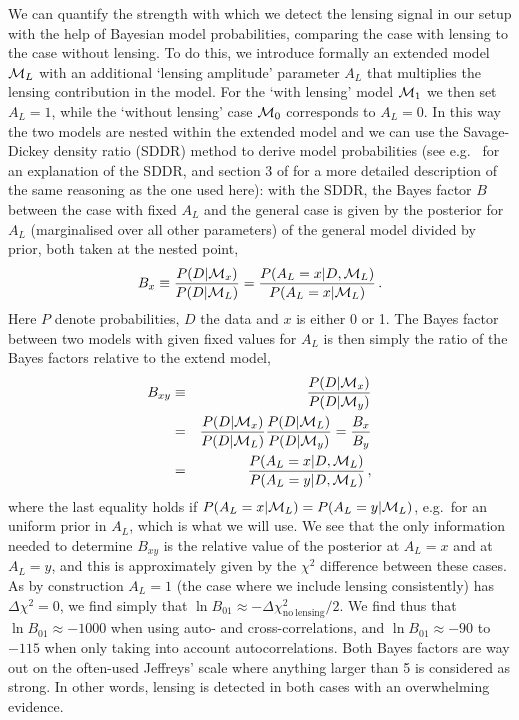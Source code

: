 We can quantify the strength with which we detect the lensing signal in our setup with the help of Bayesian model probabilities, comparing the case with lensing to the case without lensing. To do this, we introduce formally an extended model ${\mathcal M}_L$ with an additional `lensing amplitude' parameter $A_L$ that multiplies the lensing contribution in the model. For the `with lensing' model ${\mathcal M}_1$ we then set $A_L = 1$, while the `without lensing' case ${\mathcal M}_0$ corresponds to $A_L=0$. In this way the two models are nested within the extended model and we can use the Savage-Dickey density ratio (SDDR) method to derive model probabilities (see e.g.\ \cite{Trotta:2005ar} for an explanation of the SDDR, and section 3 of \cite{Dirian:2016puz} for a more detailed description of the same reasoning as the one used here): with the SDDR, the Bayes factor $B$ between the case with fixed $A_L$ and the general case is given by the posterior for $A_L$ (marginalised over all other parameters) of the general model divided by prior, both taken at the nested point,
\begin{equation}
B_x \equiv \frac{P(D|{\mathcal M}_x)}{P(D|{\mathcal M}_L)} = \frac{P(A_L=x|D,{\mathcal M}_L)}{P(A_L=x|{\mathcal M}_L)} \, .
\end{equation}
Here $P$ denote probabilities, $D$ the data and $x$ is either 0 or 1.
The Bayes factor between two models with given fixed values for $A_L$ is then simply the ratio of the Bayes factors relative to the extend model,
\begin{eqnarray}
B_{xy} &\equiv& \frac{P(D|{\mathcal M}_x)}{P(D|{\mathcal M}_y)} \nonumber \\
&=& \frac{P(D|{\mathcal M}_x)}{P(D|{\mathcal M}_L)} \frac{P(D|{\mathcal M}_L)}{P(D|{\mathcal M}_y)} = \frac{B_x}{B_y} \nonumber \\
 &=& \frac{P(A_L=x|D,{\mathcal M}_L)}{P(A_L=y|D,{\mathcal M}_L)} \, ,
\end{eqnarray}
where the last equality holds if $P(A_L=x|{\mathcal M}_L)=P(A_L=y|{\mathcal M}_L)$, e.g.\ for an uniform prior in $A_L$, which is what we will use. We see that the only information needed to determine $B_{xy}$ is the relative value of the posterior at $A_L=x$ and at $A_L=y$, and this is approximately given by the $\chi^2$ difference between these cases. As by construction $A_L=1$ (the case where we include lensing consistently) has $\Delta\chi^2=0$, we find simply that $\ln B_{01} \approx -\Delta\chi^2_{\mathrm{no~lensing}}/2$. We find thus that $\ln B_{01} \approx -1000$ when using auto- and cross-correlations, and $\ln B_{01} \approx -90$ to $-115$ when only taking into account autocorrelations. Both Bayes factors are way out on the often-used Jeffreys' scale \cite{Jeffreys:1939xee} where anything larger than 5 is considered as strong. In other words, lensing is detected in both cases with an overwhelming evidence.

